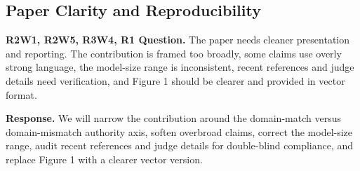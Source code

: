\documentclass[11pt]{article}
\begin{document}
\subsection{Paper Clarity and Reproducibility}

\noindent
\textbf{R2W1, R2W5, R3W4, R1 Question.}
The paper needs cleaner presentation and reporting. The contribution is framed too broadly, some claims use overly strong language, the model-size range is inconsistent, recent references and judge details need verification, and Figure 1 should be clearer and provided in vector format.

\noindent
\textbf{Response.}
We will narrow the contribution around the domain-match versus domain-mismatch authority axis, soften overbroad claims, correct the model-size range, audit recent references and judge details for double-blind compliance, and replace Figure 1 with a clearer vector version.
\end{document}
